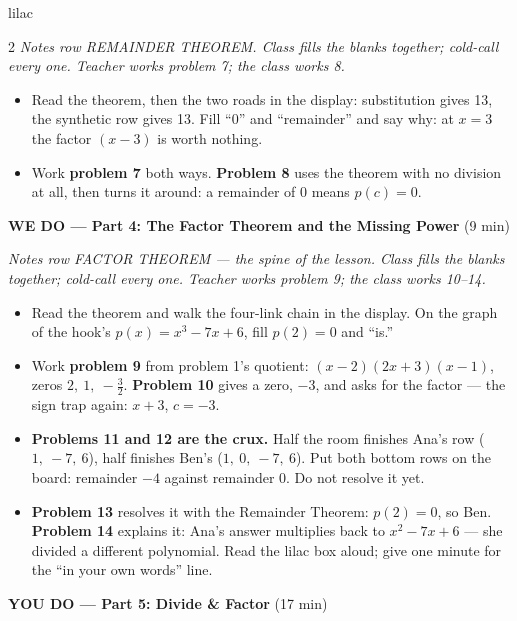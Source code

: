 \documentclass[10pt]{article}
\begin{document}
\begin{skillbox}{lilac}
\begin{multicols}{2}
\textit{Notes row REMAINDER THEOREM. Class fills the blanks together; cold-call every one.
Teacher works problem 7; the class works 8.}
\begin{itemize}
  \item Read the theorem, then the two roads in the display: substitution gives 13, the
        synthetic row gives 13. Fill ``$0$'' and ``remainder'' and say why: at $x = 3$ the
        factor $(x - 3)$ is worth nothing.
  \item Work \textbf{problem 7} both ways. \textbf{Problem 8} uses the theorem with no
        division at all, then turns it around: a remainder of 0 means $p(c) = 0$.
\end{itemize}

\columnbreak

\textbf{WE DO --- Part 4: The Factor Theorem and the Missing Power} (9 min)

\textit{Notes row FACTOR THEOREM --- the spine of the lesson. Class fills the blanks together;
cold-call every one. Teacher works problem 9; the class works 10--14.}
\begin{itemize}
  \item Read the theorem and walk the four-link chain in the display. On the graph of the
        hook's $p(x) = x^3 - 7x + 6$, fill $p(2) = 0$ and ``is.''
  \item Work \textbf{problem 9} from problem 1's quotient: $(x - 2)(2x + 3)(x - 1)$, zeros
        $2,\ 1,\ -\tfrac{3}{2}$. \textbf{Problem 10} gives a zero, $-3$, and asks for the
        factor --- the sign trap again: $x + 3$, $c = -3$.
  \item \textbf{Problems 11 and 12 are the crux.} Half the room finishes Ana's row
        ($1,\ -7,\ 6$), half finishes Ben's ($1,\ 0,\ -7,\ 6$). Put both bottom rows on the
        board: remainder $-4$ against remainder $0$. Do not resolve it yet.
  \item \textbf{Problem 13} resolves it with the Remainder Theorem: $p(2) = 0$, so Ben.
        \textbf{Problem 14} explains it: Ana's answer multiplies back to $x^2 - 7x + 6$ ---
        she divided a different polynomial. Read the lilac box aloud; give one minute for the
        ``in your own words'' line.
\end{itemize}

\textbf{YOU DO --- Part 5: Divide \& Factor} (17 min)


\end{multicols}
\end{skillbox}
\end{document}

